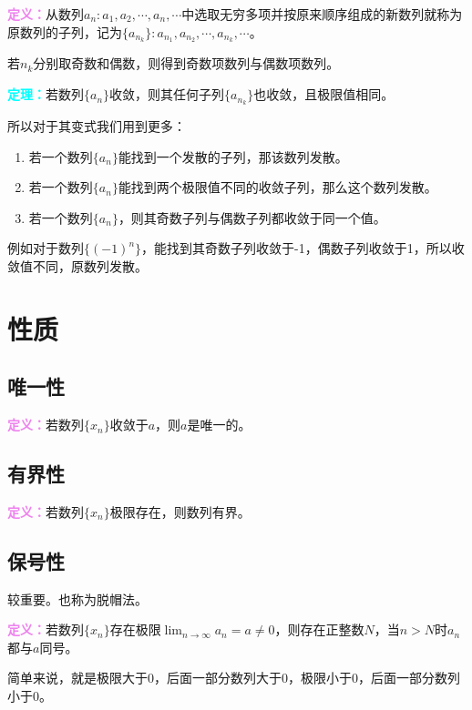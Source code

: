 \documentclass[UTF8]{ctexart}
\begin{document}
\textcolor{violet}{\textbf{定义：}}从数列${a_n}:a_1,a_2,\cdots,a_n,\cdots$中选取无穷多项并按原来顺序组成的新数列就称为原数列的子列，记为$\{a_{n_k}\}:a_{n_1},a_{n_2},\cdots,a_{n_k},\cdots$。

若$n_k$分别取奇数和偶数，则得到奇数项数列与偶数项数列。

\textcolor{aqua}{\textbf{定理：}}若数列$\{a_n\}$收敛，则其任何子列$\{a_{n_k}\}$也收敛，且极限值相同。

所以对于其变式我们用到更多：

\begin{enumerate}
    \item 若一个数列$\{a_n\}$能找到一个发散的子列，那该数列发散。
    \item 若一个数列$\{a_n\}$能找到两个极限值不同的收敛子列，那么这个数列发散。
    \item 若一个数列$\{a_n\}$，则其奇数子列与偶数子列都收敛于同一个值。
\end{enumerate}

例如对于数列$\{(-1)^n\}$，能找到其奇数子列收敛于-1，偶数子列收敛于1，所以收敛值不同，原数列发散。

\section{性质}
\subsection{唯一性}

\textcolor{violet}{\textbf{定义：}}若数列$\{x_n\}$收敛于$a$，则$a$是唯一的。

\subsection{有界性}

\textcolor{violet}{\textbf{定义：}}若数列$\{x_n\}$极限存在，则数列有界。

\subsection{保号性}

较重要。也称为脱帽法。

\textcolor{violet}{\textbf{定义：}}若数列$\{x_n\}$存在极限$\lim_{n\to\infty}a_n=a\neq 0$，则存在正整数$N$，当$n>N$时$a_n$都与$a$同号。

简单来说，就是极限大于0，后面一部分数列大于0，极限小于0，后面一部分数列小于0。
\end{document}
